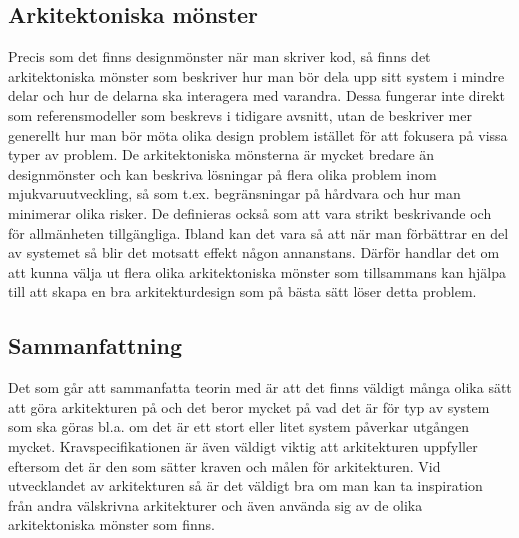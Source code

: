 \subsection{Arkitektoniska mönster}
Precis som det finns designmönster när man skriver kod, så finns det arkitektoniska mönster som beskriver hur man bör dela upp sitt system i mindre delar och hur de delarna ska interagera med varandra. Dessa fungerar inte direkt som referensmodeller som beskrevs i tidigare avsnitt, utan de beskriver mer generellt hur man bör möta olika design problem istället för att fokusera på vissa typer av problem.
\newline
\newline
De arkitektoniska mönsterna är mycket bredare än designmönster och kan beskriva lösningar på flera olika problem inom mjukvaruutveckling, så som t.ex. begränsningar på hårdvara och hur man minimerar olika risker. De definieras också som att vara strikt beskrivande och för allmänheten tillgängliga. \citep{Wiki}
\newline
\newline
Ibland kan det vara så att när man förbättrar en del av systemet så blir det motsatt effekt någon annanstans. Därför handlar det om att kunna välja ut flera olika arkitektoniska mönster som tillsammans kan hjälpa till att skapa en bra arkitekturdesign som på bästa sätt löser detta problem.

\subsection{Sammanfattning}
Det som går att sammanfatta teorin med är att det finns väldigt många olika sätt att göra arkitekturen på och det beror mycket på vad det är för typ av system som ska göras bl.a. om det är ett stort eller litet system påverkar utgången mycket. Kravspecifikationen är även väldigt viktig att arkitekturen uppfyller eftersom det är den som sätter kraven och målen för arkitekturen.
\newline
\newline
Vid utvecklandet av arkitekturen så är det väldigt bra om man kan ta inspiration från andra välskrivna arkitekturer och även använda sig av de olika arkitektoniska mönster som finns.
